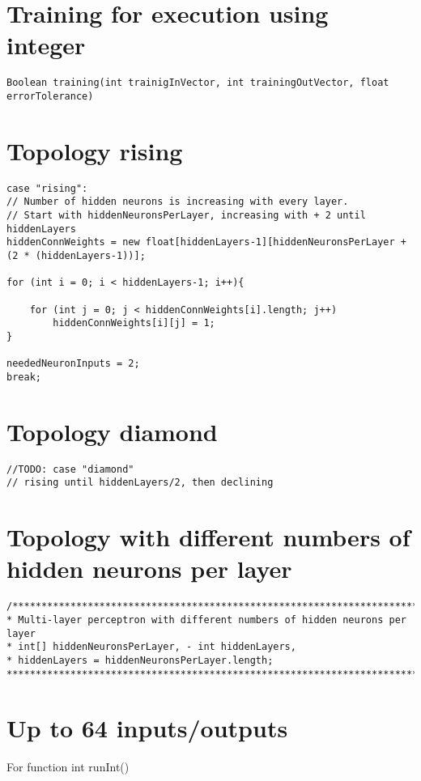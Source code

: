\section{Training for execution using integer}
\begin{lstlisting}
Boolean training(int trainigInVector, int trainingOutVector, float errorTolerance)
\end{lstlisting}

\section{Topology rising}
\begin{lstlisting}
case "rising":
// Number of hidden neurons is increasing with every layer.
// Start with hiddenNeuronsPerLayer, increasing with + 2 until hiddenLayers
hiddenConnWeights = new float[hiddenLayers-1][hiddenNeuronsPerLayer + (2 * (hiddenLayers-1))];

for (int i = 0; i < hiddenLayers-1; i++){

	for (int j = 0; j < hiddenConnWeights[i].length; j++)
		hiddenConnWeights[i][j] = 1;
}

neededNeuronInputs = 2;
break;
\end{lstlisting}

\section{Topology diamond}
\begin{lstlisting}
//TODO: case "diamond"
// rising until hiddenLayers/2, then declining
\end{lstlisting}

\section{Topology with different numbers of hidden neurons per layer}
\begin{lstlisting}
/****************************************************************************************
* Multi-layer perceptron with different numbers of hidden neurons per layer
* int[] hiddenNeuronsPerLayer, - int hiddenLayers,
* hiddenLayers = hiddenNeuronsPerLayer.length;
****************************************************************************************/
\end{lstlisting}

\section{Up to 64 inputs/outputs}
For function int runInt()

